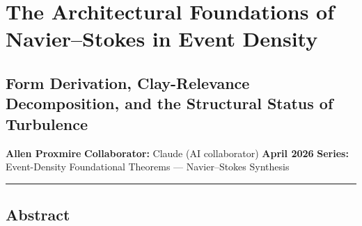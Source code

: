 \documentclass[
]{article}
\author{}
\date{}
\begin{document}
\section{The Architectural Foundations of Navier--Stokes in Event
Density}\label{the-architectural-foundations-of-navierstokes-in-event-density}

\subsection{Form Derivation, Clay-Relevance Decomposition, and the
Structural Status of
Turbulence}\label{form-derivation-clay-relevance-decomposition-and-the-structural-status-of-turbulence}

\textbf{Allen Proxmire} \textbf{Collaborator:} Claude (AI collaborator)
\textbf{April 2026} \textbf{Series:} Event-Density Foundational Theorems
--- Navier--Stokes Synthesis

\begin{center}\rule{0.5\linewidth}{0.5pt}\end{center}

\subsection{Abstract}\label{abstract}
\end{document}
